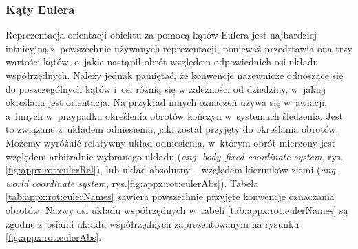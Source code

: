 \subsubsection*{Kąty Eulera} \label{sec:orientstionRep:euler}
Reprezentacja orientacji obiektu za pomocą kątów Eulera jest najbardziej intuicyjną z~powszechnie używanych reprezentacji, ponieważ przedstawia ona trzy wartości kątów, o~jakie nastąpił obrót względem odpowiednich osi układu współrzędnych. Należy jednak pamiętać, że konwencje nazewnicze odnoszące się do poszczególnych kątów i~osi różnią się w zależności od dziedziny, w~jakiej określana jest orientacja. Na przykład innych oznaczeń używa się w~awiacji, a~innych w~przypadku określenia obrotów kończyn w~systemach śledzenia. Jest to związane z~układem odniesienia, jaki został przyjęty do określania obrotów. Możemy wyróżnić relatywny układ odniesienia, w~którym obrót mierzony jest względem arbitralnie wybranego układu (\emph{ang. body--fixed coordinate system}, rys.\ref{fig:appx:rot:eulerRel}), lub układ absolutny -- względem kierunków ziemi (\emph{ang. world coordinate system}, rys.\ref{fig:appx:rot:eulerAbs}). Tabela \ref{tab:appx:rot:eulerNames} zawiera powszechnie przyjęte konwencje oznaczania obrotów. Nazwy osi układu współrzędnych w~tabeli  \ref{tab:appx:rot:eulerNames} są zgodne z~osiami układu współrzędnych zaprezentowanym na rysunku \ref{fig:appx:rot:eulerAbs}.
																													
